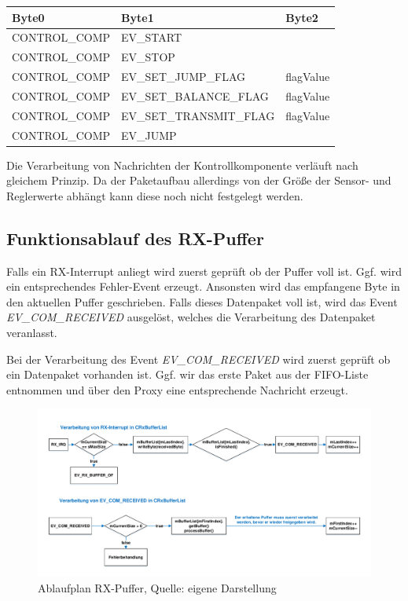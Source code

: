 \documentclass{article}
\begin{document}
\begin{table}[h]
\centering
\label{my-label}
\begin{tabular}{|l|l|l|}
\hline
\textbf{Byte0} & \textbf{Byte1}          & \textbf{Byte2}     \\ \hline
CONTROL\_COMP  & EV\_START               &           \\ \hline
CONTROL\_COMP  & EV\_STOP                &           \\ \hline
CONTROL\_COMP  & EV\_SET\_JUMP\_FLAG     & flagValue \\ \hline
CONTROL\_COMP  & EV\_SET\_BALANCE\_FLAG  & flagValue \\ \hline
CONTROL\_COMP  & EV\_SET\_TRANSMIT\_FLAG & flagValue \\ \hline
CONTROL\_COMP  & EV\_JUMP                &           \\ \hline
\end{tabular}
\end{table}

Die Verarbeitung von Nachrichten der Kontrollkomponente verläuft nach gleichem Prinzip. Da der Paketaufbau allerdings von der Größe der Sensor- und Reglerwerte abhängt kann diese noch nicht festgelegt werden.

\newpage
\subsection*{Funktionsablauf des RX-Puffer}
Falls ein RX-Interrupt anliegt wird zuerst geprüft ob der Puffer voll ist. Ggf. wird ein entsprechendes Fehler-Event erzeugt. Ansonsten wird das empfangene Byte in den aktuellen Puffer geschrieben. Falls dieses Datenpaket voll ist, wird das Event \textit{EV\_COM\_RECEIVED} ausgelöst, welches die Verarbeitung des Datenpaket veranlasst.

Bei der Verarbeitung des Event \textit{EV\_COM\_RECEIVED}  wird zuerst geprüft ob ein Datenpaket vorhanden ist. Ggf. wir das erste Paket aus der FIFO-Liste entnommen und über den Proxy eine entsprechende Nachricht erzeugt.

\begin{figure}[h]
	\includegraphics[width=\linewidth]{PAP_RxPuffer}
	\caption{Ablaufplan RX-Puffer, Quelle: eigene Darstellung}
\end{figure}
\end{document}
